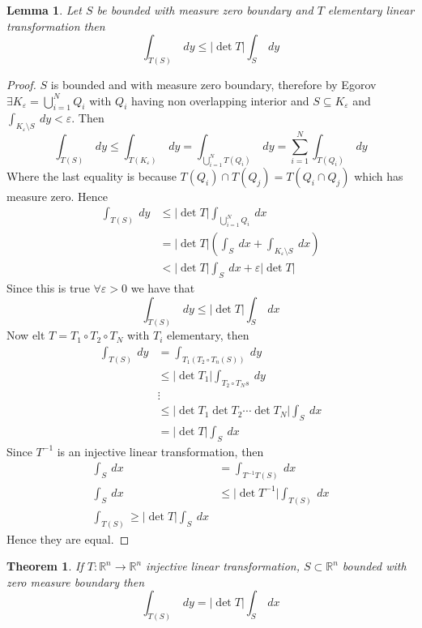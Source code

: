 \documentclass[11pt,a4paper]{article}
\theoremstyle{definition}
\theoremstyle{plain}
\newtheorem{theorem}[definition]{Theorem}
\newtheorem{lemma}[definition]{Lemma}
\theoremstyle{remark}
\newcommand{\R}{\mathbb{R}}
\newcommand{\abs}[1]{\lvert #1 \rvert}
\begin{document}
\begin{lemma}
    Let $S$ be bounded with measure zero boundary and $T$ elementary linear transformation then 
    $$\int_{T(S)} \ dy \le \abs{\det T} \int_{S} \ dy$$
\end{lemma}

\begin{proof}
    $S$ is bounded and with measure zero boundary, therefore by Egorov $\exists K_\varepsilon = \bigcup_{i=1}^N Q_i$ with $Q_i$ having non 
    overlapping interior and $S \subseteq K_\varepsilon$ and $\int_{K_\varepsilon \setminus S} \ dy < \varepsilon$. Then 
    $$\int_{T(S)} \ dy \le \int_{T(K_\varepsilon)} \ dy = \int_{\bigcup_{i=1}^N T(Q_i)} \ dy = \sum_{i=1}^N \int_{T(Q_i)} \ dy$$
    Where the last equality is because $T(Q_i) \cap T(Q_j) = T(Q_i \cap Q_j)$  which has measure zero. Hence 
    \begin{align*}
        \int_{T(S)} \ dy &\le \abs{\det T} \int_{\bigcup_{i=1}^N Q_i} \ dx \\
        &= \abs{\det T} (\int_S \ dx + \int_{K_\varepsilon \setminus S} \ dx) \\
        &< \abs{\det T} \int_S \ dx + \varepsilon \abs{\det T}
    \end{align*}
    Since this is true $\forall \varepsilon > 0$ we have that 
    $$\int_{T(S)} \ dy \le \abs{\det T} \int_S \ dx$$
    Now elt $T = T_1 \circ T_2 \circ T_N$ with $T_i$ elementary, then 
    \begin{align*}
        \int_{T(S)} \ dy &= \int_{T_1 (T_2 \circ T_n (S))} \ dy \\
        &\le \abs{\det T_1} \int_{T_2 \circ T_N s} \ dy \\
        &\vdots \\
        &\le \abs{\det T_1 \det T_2 \cdots \det T_N} \int_S \ dx \\
        &= \abs{\det T} \int_S \ dx
    \end{align*}
    Since $T^{-1}$ is an injective linear transformation, then 
    \begin{align*}
        \int_S \ dx &= \int_{T^{-1} T(S)} \ dx \\
        \int_S \ dx &\le \abs{\det T^{-1}} \int_{T(S)} \ dx \\
        \int_{T(S)} \ge \abs{\det T} \int_S \ dx 
    \end{align*}
    Hence they are equal.
\end{proof}


\begin{theorem}
    If $T \colon \R^n \to \R^n$ injective linear transformation, $S \subset \R^n$ bounded with zero measure boundary then 
    $$\int_{T(S)} \ dy = \abs{\det T} \int_S \ dx$$
\end{theorem}
\end{document}
